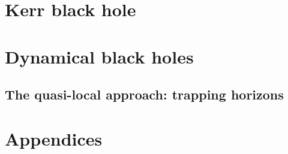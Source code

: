 \documentclass[12pt,a4paper]{book}
\begin{document}




\part{Kerr black hole}





\part{Dynamical black holes}





\chapter{The quasi-local approach: trapping horizons} \label{s:loc}


\appendix

\part{Appendices}









\cleardoublepage
{} %
\printindex
\end{document}
